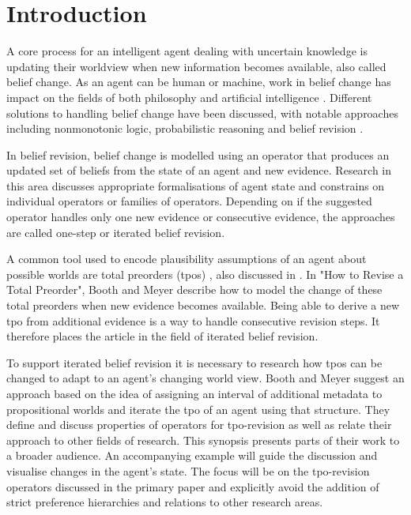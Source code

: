 \documentclass[english, 12pt]{scrartcl}
\theoremstyle{definition}
\theoremstyle{definition}
\theoremstyle{definition}
\begin{document}
\newpage

\tableofcontents

\newpage

\section{Introduction}
A core process for an intelligent agent dealing with uncertain knowledge is updating their worldview when new information becomes available, also called belief change. As an agent can be human or machine, work in belief change has impact on the fields of both philosophy and artificial intelligence \cite{Ferme2011}. Different solutions to handling belief change have been discussed, with notable approaches including nonmonotonic logic, probabilistic reasoning and belief revision \cite{Darwiche1997}.

In belief revision, belief change is modelled using an operator that produces an updated set of beliefs from the state of an agent and new evidence. Research in this area discusses appropriate formalisations of agent state and constrains on individual operators or families of operators. Depending on if the suggested operator handles only one new evidence or consecutive evidence, the approaches are called one-step or iterated belief revision.

A common tool used to encode plausibility assumptions of an agent about possible worlds are total preorders (tpos) \cite{Booth2011}, also discussed in \cite{Katsuno1991}. In "How to Revise a Total Preorder", Booth and Meyer describe how to model the change of these total preorders when new evidence becomes available. Being able to derive a new tpo from additional evidence is a way to handle consecutive revision steps. It therefore places the article in the field of iterated belief revision.

To support iterated belief revision it is necessary to research how tpos can be changed to adapt to an agent's changing world view.
Booth and Meyer suggest an approach based on the idea of assigning an interval of additional metadata to propositional worlds and iterate the tpo of an agent using that structure. They define and discuss properties of operators for tpo-revision as well as relate their approach to other fields of research.
This synopsis presents parts of their work to a broader audience. An accompanying example will guide the discussion and visualise changes in the agent's state. The focus will be on the tpo-revision operators discussed in the primary paper and explicitly avoid the addition of strict preference hierarchies and relations to other research areas.
\end{document}

